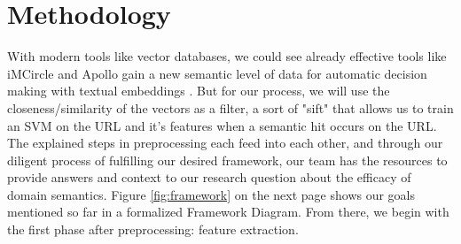 \documentclass[conference]{IEEEtran}
\begin{document}
\section{Methodology}  %
With modern tools like vector databases, we could see already effective tools like iMCircle and Apollo gain a new semantic level of data for automatic decision making with textual embeddings \cite{desolda_apollo_2025, zhang1}. But for our process, we will use the closeness/similarity of the vectors as a filter, a sort of "sift" that allows us to train an SVM on the URL and it's features when a semantic hit occurs on the URL. The explained steps in preprocessing each feed into each other, and through our diligent process of fulfilling our desired framework, our team has the resources to provide answers and context to our research question about the efficacy of domain semantics. Figure \ref{fig:framework} on the next page shows our goals mentioned so far in a formalized Framework Diagram. From there, we begin with the first phase after preprocessing: feature extraction. 
\clearpage
\end{document}
